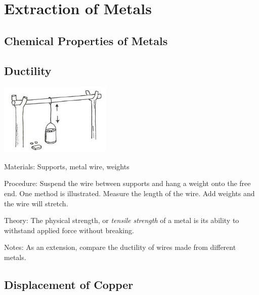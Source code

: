\section{Extraction of Metals}

\begin{multicols}{2}


\section*{Chemical Properties of Metals}


\subsection{Ductility}

\begin{center}
\includegraphics[width=0.4\textwidth]{./img/vso/ductility.jpg}
\end{center}

\begin{description*}
\item[Materials:]{Supports, metal wire, weights}
\item[Procedure:]{Suspend the wire between
supports and hang a weight onto
the free end. One method is
illustrated. Measure the length of
the wire. Add weights and the
wire will stretch.}
\item[Theory:]{The physical strength, or \emph{tensile strength} of a metal is its ability to withstand applied force without breaking.}
\item[Notes:]{As an extension, compare the
ductility of wires made from
different metals.}
\end{description*}

\subsection{Displacement of Copper} %


\end{multicols}
